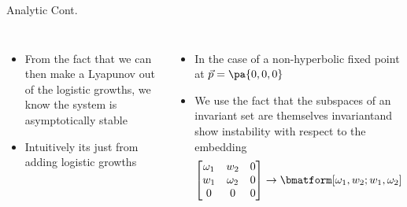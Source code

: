 \documentclass[aspectratio=169,  notheorems, sOuRcEs]{RUCPresentation}
\begin{document}
\begin{frame}{Analytic Cont.}


    \begin{columns}[T]
        \column{0.5\framewidth}
        \begin{itemize}
            \item From the fact that we can then make a Lyapunov
                out of the logistic growths, we know the system is
                asymptotically stable
            \item Intuitively its just from adding logistic growths
        \end{itemize}


        \column{0.5\framewidth}
        \begin{itemize}
            \item In the case of a non-hyperbolic fixed point at
                \(\vec{p}=\pa{0,0,0}\)
            \item We use the fact that the subspaces of an invariant set
                are themselves invariant\footnotemark[2]
                and show instability with respect to the embedding
                \begin{equation*}
                    \left[
                        \begin{matrix}
                            \omega_1& w_2 & 0 \\
                            w_1 & \omega_2 & 0 \\
                            0 & 0 & 0
                        \end{matrix}
                    \right]
                    \to
                    \bmatform[\omega_1, w_2; w_1, \omega_2]
                \end{equation*}
        \end{itemize}

    \end{columns}

\end{frame}
\end{document}
